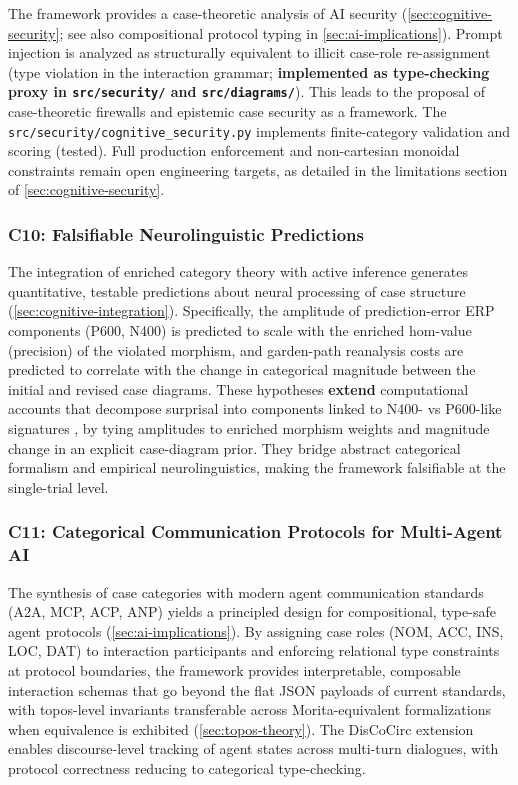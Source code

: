 \documentclass[
]{article}
\begin{document}
The framework provides a case-theoretic analysis of AI security
(\autoref{sec:cognitive-security}; see also compositional protocol
typing in \autoref{sec:ai-implications}). Prompt injection is analyzed
as structurally equivalent to illicit case-role re-assignment (type
violation in the interaction grammar; \textbf{implemented as
type-checking proxy in \texttt{src/security/} and
\texttt{src/diagrams/}}). This leads to the proposal of case-theoretic
firewalls and epistemic case security as a framework. The
\texttt{src/security/cognitive\_security.py} implements finite-category
validation and scoring (tested). Full production enforcement and
non-cartesian monoidal constraints remain open engineering targets, as
detailed in the limitations section of \autoref{sec:cognitive-security}.

\subsubsection{C10: Falsifiable Neurolinguistic
Predictions}\label{c10-falsifiable-neurolinguistic-predictions}

The integration of enriched category theory with active inference
generates quantitative, testable predictions about neural processing of
case structure (\autoref{sec:cognitive-integration}). Specifically, the
amplitude of prediction-error ERP components (P600, N400) is predicted
to scale with the enriched hom-value (precision) of the violated
morphism, and garden-path reanalysis costs are predicted to correlate
with the change in categorical magnitude between the initial and revised
case diagrams. These hypotheses \textbf{extend} computational accounts
that decompose surprisal into components linked to N400- vs P600-like
signatures \citep{li2023decomposition, li2024shallow}, by tying
amplitudes to enriched morphism weights and magnitude change in an
explicit case-diagram prior. They bridge abstract categorical formalism
and empirical neurolinguistics, making the framework falsifiable at the
single-trial level.

\subsubsection{C11: Categorical Communication Protocols for Multi-Agent
AI}\label{c11-categorical-communication-protocols-for-multi-agent-ai}

The synthesis of case categories with modern agent communication
standards (A2A, MCP, ACP, ANP) yields a principled design for
compositional, type-safe agent protocols
(\autoref{sec:ai-implications}). By assigning case roles (NOM, ACC, INS,
LOC, DAT) to interaction participants and enforcing relational type
constraints at protocol boundaries, the framework provides
interpretable, composable interaction schemas that go beyond the flat
JSON payloads of current standards, with topos-level invariants
transferable across Morita-equivalent formalizations when equivalence is
exhibited (\autoref{sec:topos-theory}). The DisCoCirc extension enables
discourse-level tracking of agent states across multi-turn dialogues,
with protocol correctness reducing to categorical type-checking.
\end{document}
